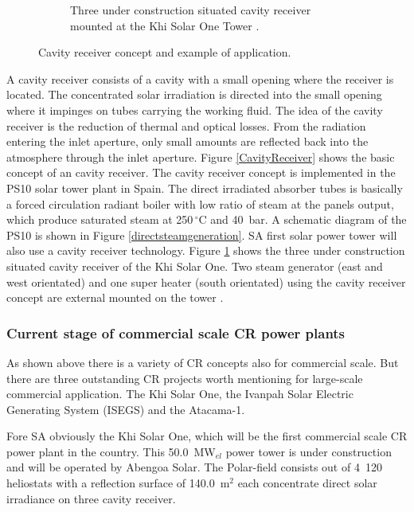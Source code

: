 \begin{figure}[!htbp]
\begin{subfigure}[b]{0.5\textwidth}
                \caption{Three under construction situated cavity receiver mounted at the  Khi Solar One Tower \cite{CMI_Energy2015}.}\label{KhiSolarOneReceiver}
        \end{subfigure}
        \caption[Cacity receiver concept and example of application.]{Cavity receiver concept and example of application.}\label{CavityReceiverConceptKhiSolar}
\end{figure}


A cavity receiver consists of a cavity with a small opening where the receiver is located. The concentrated solar irradiation is directed into the small opening where it impinges on tubes carrying the working fluid. The idea of the cavity receiver is the reduction of thermal and optical losses. From the radiation entering the inlet aperture, only small amounts are reflected back into the atmosphere through the inlet aperture. Figure \ref{CavityReceiver} shows the basic concept of an cavity receiver. The cavity receiver concept is implemented in the PS10 solar tower plant in Spain. The direct irradiated absorber tubes is basically a forced circulation radiant boiler with low ratio of steam at the panels output, which produce saturated steam at 250$\,^{\circ}\mathrm{C}$ and 40~bar. A schematic diagram of the PS10 is shown in Figure \ref{directsteamgeneration}. SA first solar power tower will also use a cavity receiver technology. Figure \ref{KhiSolarOneReceiver} shows the three under construction situated cavity receiver of the Khi Solar One. Two steam generator (east and west orientated) and one super heater (south orientated) using the cavity receiver concept are external mounted on the tower \cite{Prof.Dinter2015}.
\subsubsection{Current stage of commercial scale CR power plants}
As shown above there is a variety of CR concepts also for commercial scale. But there are three outstanding CR projects worth mentioning for large-scale commercial application. The Khi Solar One, the Ivanpah Solar Electric Generating System (ISEGS) and the Atacama-1.



Fore SA obviously the Khi Solar One, which will be the first commercial scale CR power plant in the country. This 50.0~MW$_{el}$ power tower is under construction and will be operated by Abengoa Solar. The Polar-field consists out of 4~120 heliostats with a reflection surface of 140.0~m$^2$ each concentrate direct solar irradiance on three cavity receiver. \cite{NREL2014,Prof.Dinter2015}



